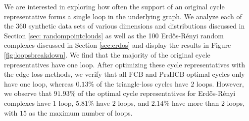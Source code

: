 \documentclass[11pt,onecolumn]{article}
\newcommand{\se}{Section }
\newcommand{\fig}{Figure }
\newcommand{\setoffilteredcyclebases}{\mathrm{FCB}}
\newcommand{\setofpersistenthcyclebases}{\mathrm{PrsHCB}}
\theoremstyle{plain}
\theoremstyle{definition}
\begin{document}
We are interested in exploring how often the support of an original cycle representative forms a single loop in the underlying graph. We analyze each of the 360 synthetic data sets of various dimensions and distributions discussed in \se \ref{sec: randompointclouds} as well as the 100 Erd\H{o}s-R\'enyi random complexes discussed in Section \ref{sec:erdos} and display the results in \fig \ref{fig:loopsbreakdown}. We find that the majority of the original cycle representatives have one loop. %
After optimizing these cycle representatives with the edge-loss methods, we verify that all $\setoffilteredcyclebases$ and $\setofpersistenthcyclebases$ optimal cycles only have one loop, whereas $0.13\%$ of the triangle-loss cycles have $2$ loops. However, we observe that $91.93\%$ of the optimal cycle representatives for Erd\H{o}s-R\'enyi complexes have $1$ loop, $5.81\%$ have $2$ loops, and $2.14\%$ have more than $2$ loops, with $15$ as the maximum number of loops. 
\end{document}
